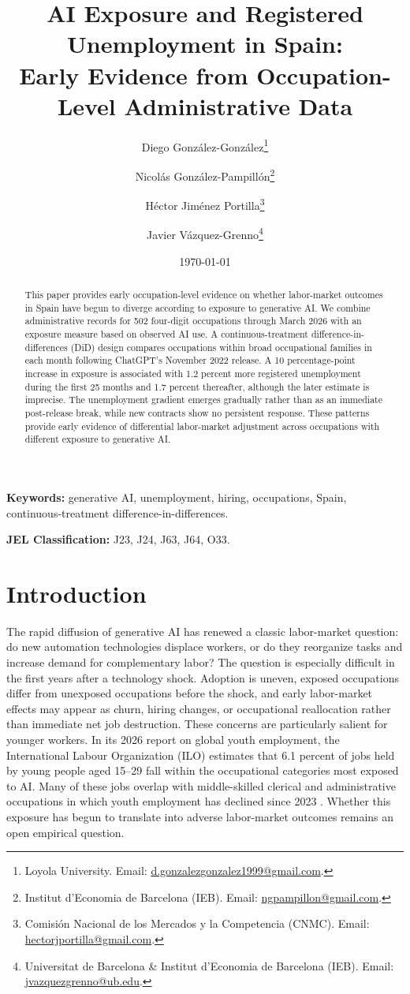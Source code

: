 \documentclass[11pt]{article}
\title{AI Exposure and Registered Unemployment in Spain:\\Early Evidence from Occupation-Level Administrative Data}%
\author{
Diego Gonz\'alez-Gonz\'alez\thanks{Loyola University. Email: \href{mailto:d.gonzalezgonzalez1999@gmail.com}{d.gonzalezgonzalez1999@gmail.com}.%
}
\and
Nicol\'as Gonz\'alez-Pampill\'on\thanks{Institut d'Economia de Barcelona (IEB). Email: \href{mailto:ngpampillon@gmail.com}{ngpampillon@gmail.com}. %
}
\and
H\'ector Jim\'enez Portilla\thanks{Comisi\'on Nacional de los Mercados y la Competencia (CNMC). Email: \href{mailto:hectorjportilla@gmail.com}{hectorjportilla@gmail.com}.}
\and
Javier V\'azquez-Grenno\thanks{Universitat de Barcelona \& Institut d'Economia de Barcelona (IEB). Email: \href{mailto:jvazquezgrenno@ub.edu}{jvazquezgrenno@ub.edu}.%
}
}
\date{\today}
\begin{document}
\maketitle

\begin{abstract}
This paper provides early occupation-level evidence on whether labor-market outcomes in Spain have begun to diverge according to exposure to generative AI. We combine administrative records for 502 four-digit occupations through March 2026 with an exposure measure based on observed AI use. A continuous-treatment difference-in-differences (DiD) design compares occupations within broad occupational families in each month following ChatGPT's November 2022 release. A 10 percentage-point increase in exposure is associated with 1.2 percent more registered unemployment during the first 25 months and 1.7 percent thereafter, although the later estimate is imprecise. The unemployment gradient emerges gradually rather than as an immediate post-release break, while new contracts show no persistent response. These patterns provide early evidence of differential labor-market adjustment across occupations with different exposure to generative AI.
\end{abstract}

\noindent \textbf{Keywords:} generative AI, unemployment, hiring, occupations, Spain,\linebreak
continuous-treatment difference-in-differences.

\noindent \textbf{JEL Classification:} J23, J24, J63, J64, O33.

\section{Introduction}
\label{sec:introduction}

The rapid diffusion of generative AI has renewed a classic labor-market question: do new automation technologies displace workers, or do they reorganize tasks and increase demand for complementary labor? The question is especially difficult in the first years after a technology shock. Adoption is uneven, exposed occupations differ from unexposed occupations before the shock, and early labor-market effects may appear as churn, hiring changes, or occupational reallocation rather than immediate net job destruction. These concerns are particularly salient for younger workers. In its 2026 report on global youth employment, the International Labour Organization (ILO) estimates that 6.1 percent of jobs held by young people aged 15--29 fall within the occupational categories most exposed to AI. Many of these jobs overlap with middle-skilled clerical and administrative occupations in which youth employment has declined since 2023 \citep{ilo_youth_2026}. Whether this exposure has begun to translate into adverse labor-market outcomes remains an open empirical question.
\end{document}
